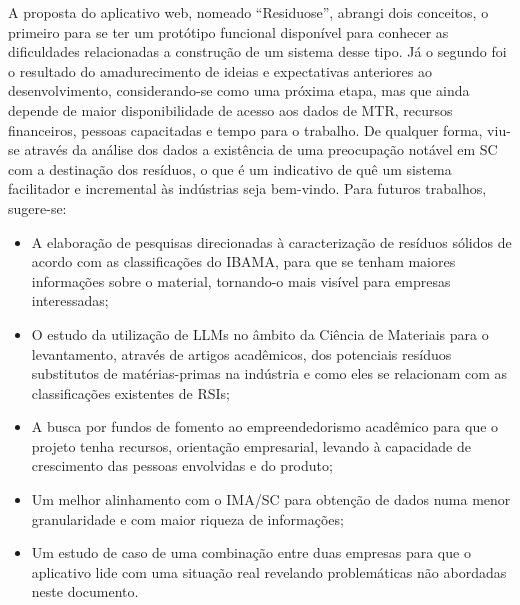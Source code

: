 A proposta do aplicativo web, nomeado “Residuose”, abrangi dois conceitos, o primeiro para se ter um protótipo funcional disponível para conhecer as dificuldades relacionadas a construção de um sistema desse tipo. Já o segundo foi o resultado do amadurecimento de ideias e expectativas anteriores ao desenvolvimento, considerando-se como uma próxima etapa, mas que ainda depende de maior disponibilidade de acesso aos dados de \gls{MTR}, recursos financeiros, pessoas capacitadas e tempo para o trabalho. De qualquer forma, viu-se através da análise dos dados a existência de uma preocupação notável em \gls{SC} com a destinação dos resíduos, o que é um indicativo de quê um sistema facilitador e incremental às indústrias seja bem-vindo. Para futuros trabalhos, sugere-se:
\begin{itemize} 
	\item A elaboração de pesquisas direcionadas à caracterização de resíduos sólidos de acordo com as classificações do \gls{IBAMA}, para que se tenham maiores informações sobre o material, tornando-o mais visível para empresas interessadas;
	\item O estudo da utilização de \gls{LLM}s no âmbito da Ciência de Materiais para o levantamento, através de artigos acadêmicos, dos potenciais resíduos substitutos de matérias-primas na indústria e como eles se relacionam com as classificações existentes de \gls{RSI}s; 
	\item A busca por fundos de fomento ao empreendedorismo acadêmico para que o projeto tenha recursos, orientação empresarial, levando à capacidade de crescimento das pessoas envolvidas e do produto;
	\item Um melhor alinhamento com o \gls{IMA/SC} para obtenção de dados numa menor granularidade e com maior riqueza de informações;
	\item Um estudo de caso de uma combinação entre duas empresas para que o aplicativo lide com uma situação real revelando problemáticas não abordadas neste documento.
\end{itemize}